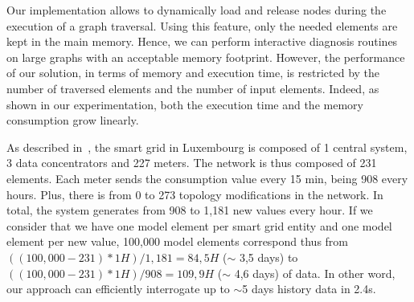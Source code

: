 
Our implementation allows to dynamically load and release nodes during the execution of a graph traversal. Using this feature, only the needed elements are kept in the main memory.  Hence, we can perform interactive diagnosis routines on large graphs with an acceptable memory footprint. 
However, the performance of our solution, in terms of memory and execution time, is restricted by the number of traversed elements and the number of input elements.
Indeed, as shown in our experimentation, both the execution time and the memory consumption grow linearly.

As described in~\cite{DBLP:conf/smartgridcomm/0001FKTPTR14}, the smart grid in Luxembourg is composed of 1 central system, 3 data concentrators and 227 meters.
The network is thus composed of 231 elements.
Each meter sends the consumption value every 15 min, being 908 every hours.
Plus, there is from 0 to 273 topology modifications in the network.
In total, the system generates from 908 to 1,181 new values every hour.
If we consider that we have one model element per smart grid entity and one model element per new value, 100,000 model elements correspond thus from $((100,000 - 231) * 1H ) / 1,181 = 84,5H$ ($\sim$ 3,5 days) to $((100,000 - 231) * 1H ) / 908 = 109,9H$ ($\sim$ 4,6 days) of data. In other word, our approach can efficiently interrogate up to $\sim$5 days history data in 2.4s.


